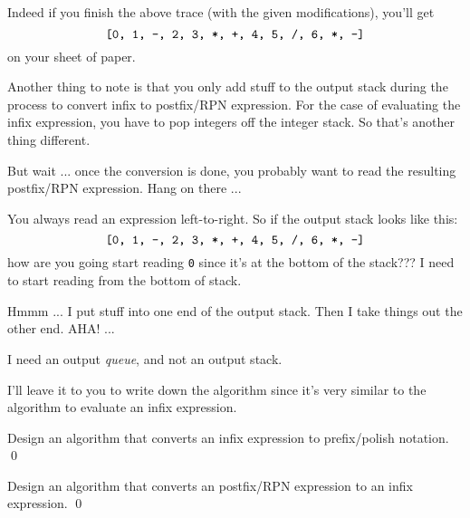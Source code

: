 Indeed if you finish the above trace (with the given modifications),
you'll get
\[
\text{\texttt{[0, 1, -, 2, 3, *, +, 4, 5, /, 6, *, -]}}
\]
on your sheet of paper.

Another thing to note is that
you only add stuff to the output stack
during the process to convert infix to postfix/RPN expression.
For the case of evaluating the infix expression, you have to
pop integers off the integer stack.
So that's another thing different.

But wait ...
once the conversion is done, you
probably want to read the resulting postfix/RPN expression.
Hang on there ...

You always read an expression left-to-right.
So if the output stack looks like this:
\[
\text{\texttt{[0, 1, -, 2, 3, *, +, 4, 5, /, 6, *, -]}}
\]
how are you going start reading \texttt{0} since it's at the bottom
of the stack???
I need to start reading from the bottom of stack.

Hmmm ... I put stuff into one end of the output stack.
Then I take things out the other end.
AHA! ...

I need an output \textit{queue}, and not an output stack.

I'll leave it to you to write down the algorithm
since it's very similar to the algorithm to
evaluate an infix expression.

\begin{ex}
Design an algorithm that converts an infix expression to prefix/polish
notation.
\qed
\end{ex}

\begin{ex}
Design an algorithm that converts an postfix/RPN expression to
an infix expression.
\qed
\end{ex}
